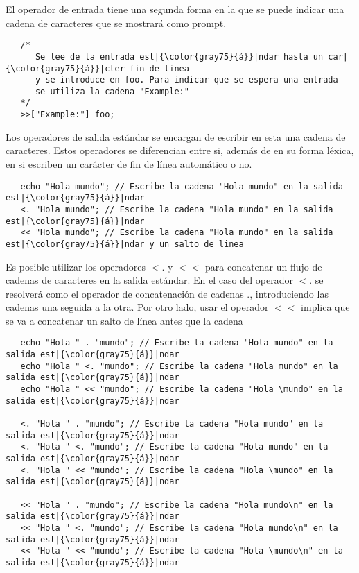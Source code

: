 El operador de entrada tiene una segunda forma en la que se puede indicar una cadena de caracteres
que se mostrará como prompt. \\

\begin{lstlisting}
   /*
      Se lee de la entrada est|{\color{gray75}{á}}|ndar hasta un car|{\color{gray75}{á}}|cter fin de linea 
      y se introduce en foo. Para indicar que se espera una entrada
      se utiliza la cadena "Example:"
   */
   >>["Example:"] foo;
\end{lstlisting}

Los operadores de salida estándar se encargan de escribir en esta una cadena de caracteres. 
Estos operadores se diferencian entre si, además de en su forma léxica, en si 
escriben un carácter de fin de línea automático o no. 
\\
\begin{lstlisting}
   echo "Hola mundo"; // Escribe la cadena "Hola mundo" en la salida est|{\color{gray75}{á}}|ndar
   <. "Hola mundo"; // Escribe la cadena "Hola mundo" en la salida est|{\color{gray75}{á}}|ndar
   << "Hola mundo"; // Escribe la cadena "Hola mundo" en la salida est|{\color{gray75}{á}}|ndar y un salto de linea
\end{lstlisting}

Es posible utilizar los operadores $<.$ y $<<$ para concatenar un flujo de cadenas de caracteres en la
salida estándar. En el caso del operador $<.$ se resolverá como el operador de concatenación de cadenas 
$.$, introduciendo las cadenas una seguida a la otra. Por otro lado, usar el operador $<<$ implica que se
va a concatenar un salto de línea antes que la cadena\\

\begin{lstlisting}
   echo "Hola " . "mundo"; // Escribe la cadena "Hola mundo" en la salida est|{\color{gray75}{á}}|ndar
   echo "Hola " <. "mundo"; // Escribe la cadena "Hola mundo" en la salida est|{\color{gray75}{á}}|ndar
   echo "Hola " << "mundo"; // Escribe la cadena "Hola \mundo" en la salida est|{\color{gray75}{á}}|ndar
   
   <. "Hola " . "mundo"; // Escribe la cadena "Hola mundo" en la salida est|{\color{gray75}{á}}|ndar
   <. "Hola " <. "mundo"; // Escribe la cadena "Hola mundo" en la salida est|{\color{gray75}{á}}|ndar
   <. "Hola " << "mundo"; // Escribe la cadena "Hola \mundo" en la salida est|{\color{gray75}{á}}|ndar
   
   << "Hola " . "mundo"; // Escribe la cadena "Hola mundo\n" en la salida est|{\color{gray75}{á}}|ndar
   << "Hola " <. "mundo"; // Escribe la cadena "Hola mundo\n" en la salida est|{\color{gray75}{á}}|ndar
   << "Hola " << "mundo"; // Escribe la cadena "Hola \mundo\n" en la salida est|{\color{gray75}{á}}|ndar
\end{lstlisting}

